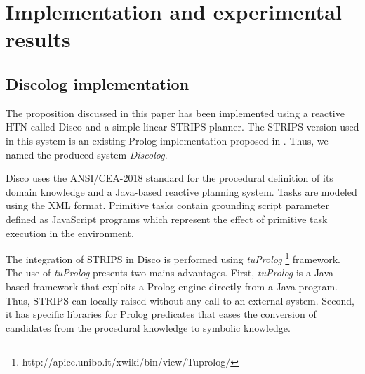 \documentclass{llncs}
\begin{document}
		\section{Implementation and experimental results}
		
			\subsection{Discolog implementation}
			\par The proposition discussed in this paper has been implemented using a reactive HTN called  Disco \cite{rich2009building} and a simple linear STRIPS planner. The STRIPS version used in this system is an existing  Prolog implementation proposed in \cite{poole1998computational}. Thus, we named the produced system \emph{Discolog}. 
			\par  Disco uses the ANSI/CEA-2018 standard for the procedural definition of its domain knowledge and a Java-based reactive planning system. Tasks are modeled using the XML format. Primitive tasks contain grounding script parameter defined as JavaScript programs which represent the effect of  primitive task execution in the environment. 
			\par  The integration of STRIPS in Disco  is performed using  \emph{tuProlog} \footnote{http://apice.unibo.it/xwiki/bin/view/Tuprolog/} framework. The use of  \emph{tuProlog} presents two mains advantages. First, \emph{tuProlog} is a Java-based framework that exploits a Prolog engine directly from a Java program. Thus, STRIPS can locally raised without any call to an external system. Second, it has specific libraries for  Prolog predicates that eases the conversion of  candidates from the procedural knowledge to symbolic knowledge. 
		
\end{document}
